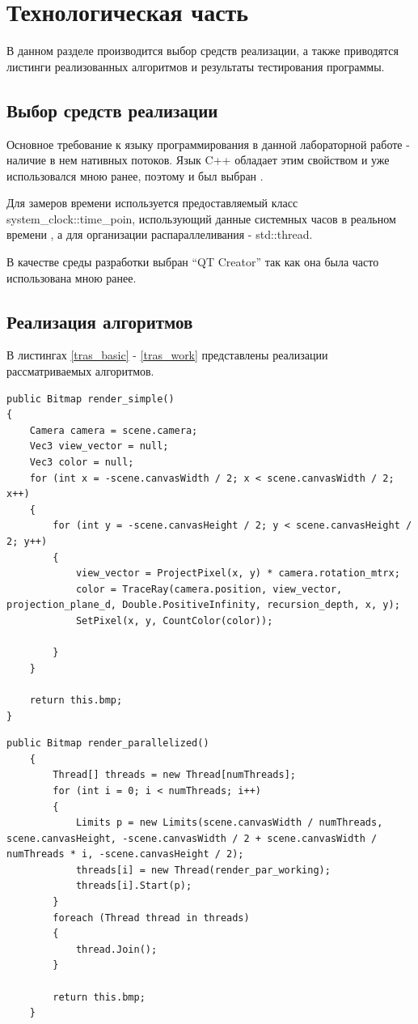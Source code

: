 \chapter{Технологическая часть}

В данном разделе производится выбор средств реализации, а также приводятся листинги реализованных алгоритмов и результаты тестирования программы.


\section{Выбор средств реализации}

Основное требование к языку программирования в данной лабораторной работе - наличие в нем нативных потоков. Язык C++ обладает этим свойством и уже использовался мною ранее, поэтому и был выбран  \cite{CBook}. 

Для замеров времени используется предоставляемый класс system\_clock::time\_poin, использующий данные системных часов в реальном времени \cite{CBook2}, а для организации распараллеливания -  std::thread.

В качестве среды разработки выбран “QT Creator” так как она была часто использована мною ранее.


\section{Реализация алгоритмов}

\lstset{style=с++}

В листингах \ref{tras_basic} - \ref{tras_work} представлены реализации рассматриваемых алгоритмов.

\begin{lstlisting}[caption=Реализация  последовательного алгоритма трассировки лучей,
	label={tras_basic}]
public Bitmap render_simple()
{
	Camera camera = scene.camera;
	Vec3 view_vector = null;
	Vec3 color = null;
	for (int x = -scene.canvasWidth / 2; x < scene.canvasWidth / 2; x++)
	{
		for (int y = -scene.canvasHeight / 2; y < scene.canvasHeight / 2; y++)
		{
			view_vector = ProjectPixel(x, y) * camera.rotation_mtrx;
			color = TraceRay(camera.position, view_vector, projection_plane_d, Double.PositiveInfinity, recursion_depth, x, y);
			SetPixel(x, y, CountColor(color));
			
		}
	}
	
	return this.bmp;
}
\end{lstlisting}


\begin{lstlisting}[caption=Реализация главного потока параллельного алгоритма трассировки лучей,
	label={tras_main}]
public Bitmap render_parallelized()
	{
		Thread[] threads = new Thread[numThreads];
		for (int i = 0; i < numThreads; i++)
		{
			Limits p = new Limits(scene.canvasWidth / numThreads, scene.canvasHeight, -scene.canvasWidth / 2 + scene.canvasWidth / numThreads * i, -scene.canvasHeight / 2);
			threads[i] = new Thread(render_par_working);
			threads[i].Start(p);
		}
		foreach (Thread thread in threads)
		{
			thread.Join();
		}
		
		return this.bmp;
	}
\end{lstlisting}


